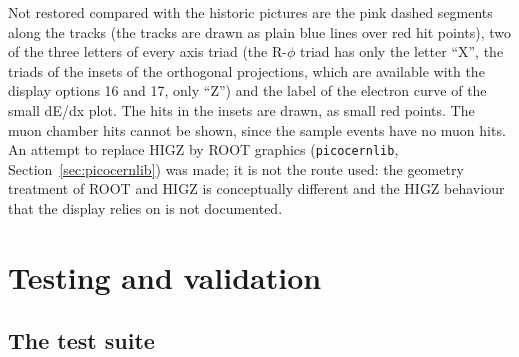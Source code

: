 Not restored compared with the historic pictures are the pink dashed segments along the tracks (the tracks are drawn as plain blue lines over red hit
points), two of the three letters of every axis triad (the R-$\phi$ triad has only the letter ``X'', the triads of the insets of the orthogonal
projections, which are available with the display options 16 and 17, only ``Z'') and the label of the electron curve of the small dE/dx plot. The hits in the insets are
drawn, as small red points. The
muon chamber hits cannot be shown, since the sample events have no muon hits. An attempt to replace HIGZ by ROOT
graphics (\texttt{picocernlib}, Section~\ref{sec:picocernlib}) was made; it is not the route used: the geometry treatment of ROOT and HIGZ is
conceptually different and the HIGZ behaviour that the display relies on is not documented.

\section{Testing and validation}

\subsection{The test suite}
\label{sec:tests}

